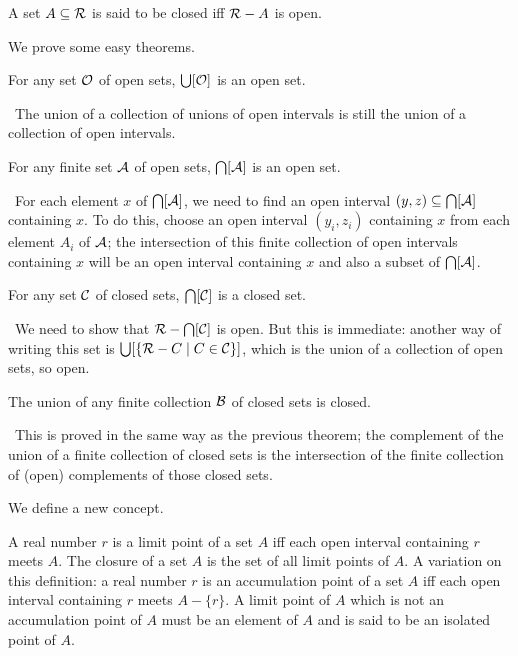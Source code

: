 \begin{definition}
 A set $A \subseteq {\cal R}$ is said to be {\upshape
 closed\/} iff ${\cal R}-A$ is open.
\end{definition}

We prove some easy theorems.

\begin{thm}
 For any set $\cal O$ of open sets, $\bigcup [{\cal
 O}]$ is an open set.
\end{thm}

\preuve\ The union of a collection of unions of open intervals
is still the union of a collection of open intervals.
\finpreuve

\begin{thm}
 For any finite set $\cal A$ of open sets, $\bigcap
 [{\cal A}]$ is an open set.
\end{thm}

\preuve\ For each element $x$ of $\bigcap[{\cal A}]$, we need to
find an open interval $(y,z)\subseteq\bigcap[{\cal A}]$ containing
$x$.  To do this, choose an open interval $(y_i,z_i)$ containing $x$
from each element $A_i$ of $\cal A$; the intersection
of this finite collection of open intervals containing $x$ will be an open
interval containing $x$ and also a subset of $\bigcap[{\cal A}]$.
\finpreuve

\begin{thm}
 For any set $\cal C$ of closed sets, $\bigcap[{\cal
 C}]$ is a closed set.
\end{thm}

\preuve\ We need to show that ${\cal R} - \bigcap[{\cal C}]$ is
open.  But this is immediate: another way of writing this set is
$\bigcup [\{{\cal R}-C \mid C \in {\cal C}\}]$, which is the union of
a collection of open sets, so open.
\finpreuve

\begin{thm}
 The union of any finite collection $\cal B$ of closed
 sets is closed.
\end{thm}

\preuve\ This is proved in the same way as the previous theorem;
the complement of the union of a finite collection of closed
sets is the intersection of the finite collection of
(open) complements of those closed sets.
\finpreuve

We define a new concept.

\begin{definition}
 A real number $r$ is a {\upshape limit point} of a set
 $A$ iff each open interval containing $r$ meets $A$.  The {\upshape
 closure} of a set $A$ is the set of all limit points of $A$.  A
 variation on this definition: a real number $r$ is an {\upshape
 accumulation point} of a set $A$ iff each open interval containing
 $r$ meets $A - \{r\}$.  A limit point of $A$ which is not an
 accumulation point of $A$ must be an element of $A$ and is said to be
 an {\upshape isolated point} of $A$.
\end{definition}

